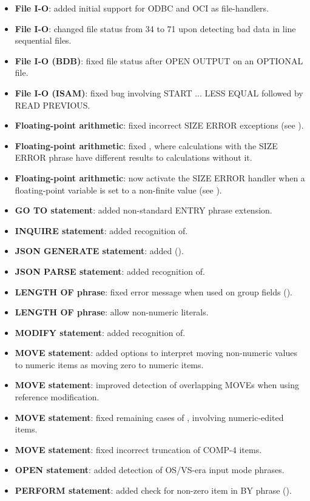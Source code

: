 \begin{itemize}
\item \textbf{File I-O}: added initial support for ODBC and OCI as file-handlers.
\item \textbf{File I-O}: changed file status from 34 to 71 upon detecting bad data in line sequential files.
\item \textbf{File I-O (BDB)}: fixed file status after OPEN OUTPUT on an OPTIONAL file.
\item \textbf{File I-O (ISAM)}: fixed bug involving START ... LESS EQUAL followed by READ PREVIOUS.
\item \textbf{Floating-point arithmetic}: fixed incorrect SIZE ERROR exceptions (see ).
\item \textbf{Floating-point arithmetic}: fixed , where calculations with the SIZE ERROR phrase have different results to calculations without it.
\item \textbf{Floating-point arithmetic}: now activate the SIZE ERROR handler when a floating-point variable is set to a non-finite value (see ).
\item \textbf{GO TO statement}: added non-standard ENTRY phrase extension.
\item \textbf{INQUIRE statement}: added recognition of.
\item \textbf{JSON GENERATE statement}: added ().
\item \textbf{JSON PARSE statement}: added recognition of.
\item \textbf{LENGTH OF phrase}: fixed error message when used on group fields ().
\item \textbf{LENGTH OF phrase}: allow non-numeric literals.
\item \textbf{MODIFY statement}: added recognition of.
\item \textbf{MOVE statement}: added options to interpret moving non-numeric values to numeric items as moving zero to numeric items.
\item \textbf{MOVE statement}: improved detection of overlapping MOVEs when using reference modification.
\item \textbf{MOVE statement}: fixed remaining cases of , involving numeric-edited items.
\item \textbf{MOVE statement}: fixed incorrect truncation of COMP-4 items.
\item \textbf{OPEN statement}: added detection of OS/VS-era input mode phrases.
\item \textbf{PERFORM statement}: added check for non-zero item in BY phrase ().

\end{itemize}

